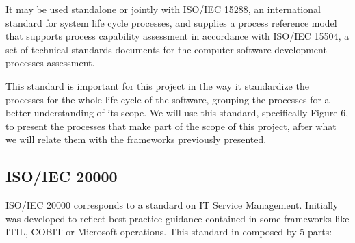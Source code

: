 It may be used standalone or jointly with ISO/IEC 15288\cite{ISO15288}, an international standard for system life cycle processes, and supplies a process reference model that supports process capability assessment in accordance with ISO/IEC 15504\cite{ISO15504}, a set of technical standards documents for the computer software development processes assessment.\par
This standard is important for this project in the way it standardize the processes for the whole life cycle of the software, grouping the processes for a better understanding of its scope. We will use this standard, specifically Figure 6, to present the processes that make part of the scope of this project, after what we will relate them with the frameworks previously presented. 


\subsection{ISO/IEC 20000}

ISO/IEC 20000 corresponds to a standard on IT Service Management. Initially was developed to reflect best practice guidance contained in some frameworks like ITIL, COBIT or Microsoft operations. This standard in composed by 5 parts:

